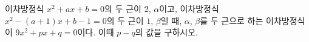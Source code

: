 이차방정식 $x^2+ax+b=0$의 두 근이 $2$, $\alpha$이고, 이차방정식 $x^2-(a+1)x+b-1=0$의 두 근이 $1$, $\beta$일 때, $\alpha$, $\beta$를 두 근으로 하는 이차방정식이 $9x^2+px+q=0$이다. 이때 $p-q$의 값을 구하시오. 
